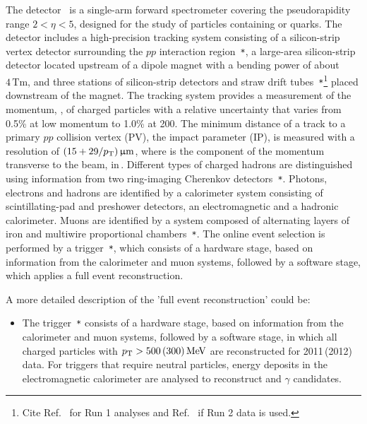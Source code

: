 The \lhcb detector~\cite{LHCb-DP-2008-001,LHCb-DP-2014-002} is a single-arm forward
spectrometer covering the \mbox{pseudorapidity} range $2<\eta <5$,
designed for the study of particles containing \bquark or \cquark
quarks. The detector includes a high-precision tracking system
consisting of a silicon-strip vertex detector surrounding the $pp$
interaction region~\cite{LHCb-DP-2014-001}\verb!*!, a large-area silicon-strip detector located
upstream of a dipole magnet with a bending power of about
$4{\mathrm{\,Tm}}$, and three stations of silicon-strip detectors and straw
drift tubes~\cite{LHCb-DP-2013-003,LHCb-DP-2017-001}\verb!*!\footnote{Cite Ref.~\cite{LHCb-DP-2013-003} for Run 1 analyses and Ref.~\cite{LHCb-DP-2017-001} if Run 2 data is used.}
placed downstream of the magnet.
The tracking system provides a measurement of the momentum, \ptot, of charged particles with
a relative uncertainty that varies from 0.5\% at low momentum to 1.0\% at 200\gevc.
The minimum distance of a track to a primary $pp$ collision vertex (PV), the impact parameter (IP), 
is measured with a resolution of $(15+29/p_{\mathrm{T}})\,\upmu\text{m}$,
where \pt is the component of the momentum transverse to the beam, in\,\gevc.
Different types of charged hadrons are distinguished using information
from two ring-imaging Cherenkov detectors~\cite{LHCb-DP-2012-003}\verb!*!. 
Photons, electrons and hadrons are identified by a calorimeter system consisting of
scintillating-pad and preshower detectors, an electromagnetic
and a hadronic calorimeter. Muons are identified by a
system composed of alternating layers of iron and multiwire
proportional chambers~\cite{LHCb-DP-2012-002}\verb!*!.
The online event selection is performed by a trigger~\cite{LHCb-DP-2012-004}\verb!*!, 
which consists of a hardware stage, based on information from the calorimeter and muon
systems, followed by a software stage, which applies a full event
reconstruction.

A more detailed description of the 'full event reconstruction' could be:
\begin{itemize}
\item The trigger~\cite{LHCb-DP-2012-004}\verb!*! consists of a
hardware stage, based on information from the calorimeter and muon
systems, followed by a software stage, in which all charged particles
with $p_{\mathrm{T}}>500\,(300)\text{\,Me\kern -0.1em V}$ are reconstructed for 2011\,(2012) data.
For triggers that require neutral particles, 
energy deposits in the electromagnetic calorimeter are 
analysed to reconstruct \piz and $\gamma$ candidates.
\end{itemize}

